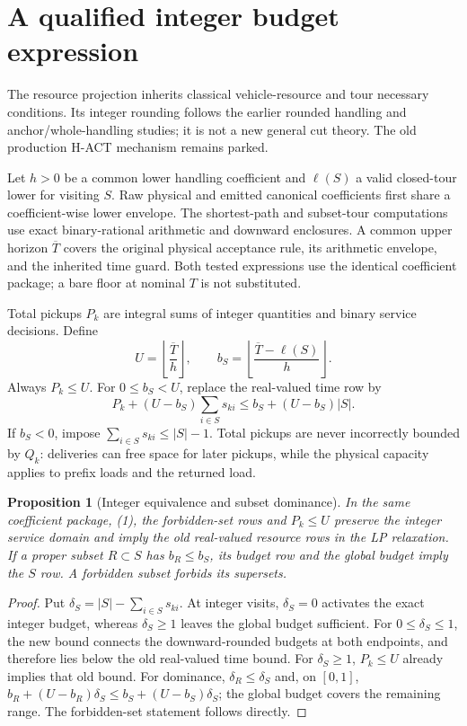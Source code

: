 \documentclass[11pt]{article}
\newtheorem{proposition}{Proposition}
\begin{document}
\section{A qualified integer budget expression}
The resource projection inherits classical vehicle-resource and tour
necessary conditions. Its integer rounding follows the earlier rounded
handling and anchor/whole-handling studies; it is not a new general cut
theory. The old production H-ACT mechanism remains parked.

Let $h>0$ be a common lower handling coefficient and $\ell(S)$ a valid
closed-tour lower for visiting $S$. Raw physical and emitted canonical
coefficients first share a coefficient-wise lower envelope. The
shortest-path and subset-tour computations use exact binary-rational
arithmetic and downward enclosures. A common upper horizon $\overline T$
covers the original physical acceptance rule, its arithmetic envelope,
and the inherited time guard. Both tested expressions use the identical
coefficient package; a bare floor at nominal $T$ is not substituted.

Total pickups $P_k$ are integral sums of integer quantities and binary
service decisions. Define
\[
 U=\left\lfloor\frac{\overline T}{h}\right\rfloor,\qquad
 b_S=\left\lfloor\frac{\overline T-\ell(S)}h\right\rfloor.
\]
Always $P_k\le U$. For $0\le b_S<U$, replace the real-valued time row by
\[
 P_k+(U-b_S)\sum_{i\in S}s_{ki}
 \le b_S+(U-b_S)|S|.                         \tag{1}
\]
If $b_S<0$, impose $\sum_{i\in S}s_{ki}\le |S|-1$.
Total pickups are never incorrectly bounded by $Q_k$: deliveries can
free space for later pickups, while the physical capacity applies to
prefix loads and the returned load.

\begin{proposition}[Integer equivalence and subset dominance]
In the same coefficient package, (1), the forbidden-set rows and
$P_k\le U$ preserve the integer service domain and imply the old
real-valued resource rows in the LP relaxation. If a proper subset
$R\subset S$ has $b_R\le b_S$, its budget row and the global budget
imply the $S$ row. A forbidden subset forbids its supersets.
\end{proposition}
\begin{proof}
Put $\delta_S=|S|-\sum_{i\in S}s_{ki}$. At integer visits, $\delta_S=0$
activates the exact integer budget, whereas $\delta_S\ge1$ leaves the
global budget sufficient. For $0\le\delta_S\le1$, the new bound connects
the downward-rounded budgets at both endpoints, and therefore lies below
the old real-valued time bound. For $\delta_S\ge1$, $P_k\le U$ already
implies that old bound. For dominance, $\delta_R\le\delta_S$ and, on
$[0,1]$, $b_R+(U-b_R)\delta_S\le b_S+(U-b_S)\delta_S$; the global budget
covers the remaining range. The forbidden-set statement follows directly.
\end{proof}
\end{document}
